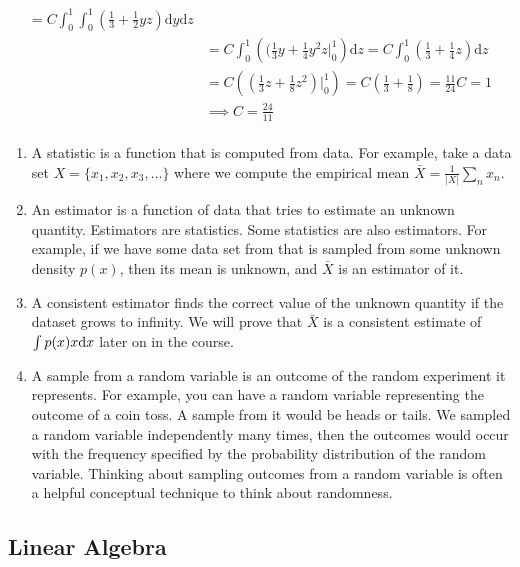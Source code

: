 \begin{enumerate}[label=\alph*.]
\begin{align*}
= C \int_0^1 \int_0^1 \left( \frac{1}{3} + \frac{1}{2} yz \right) \mathrm d y \mathrm d z \\
&= C \int_0^1 \left( (\frac{1}{3}y + \frac{1}{4} y^2 z \Big|_0^1 \right) \mathrm d z
= C \int_0^1 \left( \frac{1}{3} + \frac{1}{4} z \right) \mathrm d z \\
&= C \left( (\frac{1}{3} z + \frac{1}{8} z^2 ) \Big|_0^1 \right)
= C \left( \frac{1}{3} + \frac{1}{8} \right) = \frac{11}{24} C = 1 \\
&\implies C = \frac{24}{11}
\end{align*}
\end{enumerate}


\paragraph{}
\begin{enumerate}[label=\alph*.]
\item A statistic is a function that is computed from data. For example, take a data set $X = \{x_1, x_2, x_3, \dots\}$ where we compute the empirical mean $\bar X = \frac{1}{|X|}\sum_n x_n$.
\item An estimator is a function of data that tries to estimate an unknown quantity. Estimators are statistics. Some statistics are also estimators. For example, if we have some data set from that is sampled from some unknown density $p(x)$, then its mean is unknown, and $\bar X$ is an estimator of it.
\item A consistent estimator finds the correct value of the unknown quantity if the dataset grows to infinity. We will prove that $\bar X$ is a consistent estimate of $\int p(x) x \mathrm{d} x$ later on in the course.
\item A sample from a random variable is an outcome of the random experiment it represents. For example, you can have a random variable representing the outcome of a coin toss. A sample from it would be heads or tails. We sampled a random variable independently many times, then the outcomes would occur with the frequency specified by the probability distribution of the random variable. Thinking about sampling outcomes from a random variable is often a helpful conceptual technique to think about randomness.
\end{enumerate}

\subsection{Linear Algebra}

